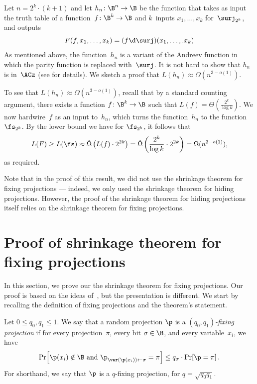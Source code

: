 Let $n=2^{k}\cdot(k+1)$ and let $h_{n}\colon\B^{n}\to\B$ be the function
that takes as input the truth table of a function~$f\colon\B^{k}\to\B$
and $k$~inputs $x_{1},\ldots,x_{k}$ for~$\surj_{2^{k}}$, and
outputs
\[
F(f,x_{1},\ldots,x_{k})=(f\d\surj)(x_{1},\ldots,.x_{k})
\]
As mentioned above, the function~$h_{n}$ is a variant of the Andreev
function in which the parity function is replaced with~$\surj$.
It is not hard to show that $h_{n}$ is in~$\ACz$ (see 
for details). We sketch a proof that $L(h_{n})\approx\Omega(n^{3-o(1)})$.

To see that $L(h_{n})\approx\Omega(n^{3-o(1)})$, recall that by a
standard counting argument, there exists a function $f\colon\B^{k}\to\B$
such that $L(f)=\Theta\left(\frac{2^{k}}{\log k}\right)$. We now
hardwire~$f$ as an input to~$h_{n}$, which turns the function~$h_{n}$
to the function~$\fs_{2^{k}}$. By the lower bound we have for $\fs_{2^{k}}$,
it follows that
\[
L(F)\ge L(\fs)\approx\tilde{\Omega}\left(L(f)\cdot2^{2k}\right)=\tilde{\Omega}\left(\frac{2^{k}}{\log k}\cdot2^{2k}\right)=\Omega(n^{3-o(1)}),
\]
as required.
\begin{remark}
Note that in the proof of this result, we did not use the shrinkage
theorem for fixing projections --- indeed, we only used the shrinkage
theorem for hiding projections. However, the proof of the shrinkage
theorem for hiding projections itself relies on the shrinkage theorem for fixing
projections.
\end{remark}


\section{\label{sec:shrinkage-fixing}Proof of shrinkage theorem for fixing
projections}

In this section, we prove our the shrinkage theorem for fixing projections.
Our proof is based on the ideas of~\cite{H98}, but the presentation
is different. We start by recalling the definition of fixing projections
and the theorem's statement.
\begin{repdefinition}{}
Let $0\le q_{0},q_{1}\le1$. We say that a random projection $\p$
is a \emph{$(q_{0},q_{1})$-fixing projection} if for every projection~$\pi$,
every bit $\sigma\in\B$, and every variable~$x_{i}$, we have
\[
\Pr\!\left[\p(x_{i})\notin\B\text{ and }\p_{\var(\p(x_{i}))\gets\sigma}=\pi\right]\le q_{\sigma}\cdot\Pr\!\left[\p=\pi\right].
\]
For shorthand, we say that $\p$ is a $q$-fixing projection, for
$q=\sqrt{q_{0}q_{1}}$. 
\end{repdefinition}

